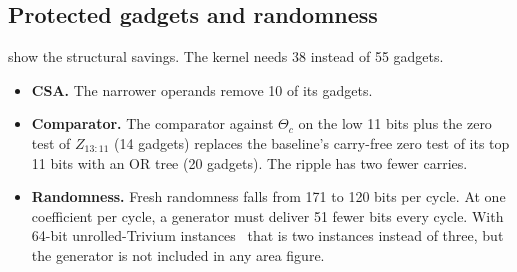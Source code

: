 \begin{table}[t]\centering\small
\caption{Synthesized area by function (mapping 0, \si{\micro\meter\squared}). Combinational cells outside gadgets are attributed to the register group their fan-out reaches (approximate where ABC merged logic).}\label{tab:resources}
\setlength{\tabcolsep}{3pt}
\end{table}

\subsection{Protected gadgets and randomness}
 show the structural savings. The kernel needs 38 instead of 55 gadgets.
\begin{itemize}
  \item \textbf{CSA.} The narrower operands remove 10 of its gadgets.
  \item \textbf{Comparator.} The comparator against $\Theta_c$ on the low 11 bits plus the zero test of $Z_{13:11}$ (14 gadgets) replaces the baseline's carry-free zero test of its top 11 bits with an OR tree (20 gadgets). The ripple has two fewer carries.
  \item \textbf{Randomness.} Fresh randomness falls from 171 to 120 bits per cycle. At one coefficient per cycle, a generator must deliver \num{51} fewer bits every cycle. With 64-bit unrolled-Trivium instances~\cite{cassiers2024rng} that is two instances instead of three, but the generator is not included in any area figure.
\end{itemize}

